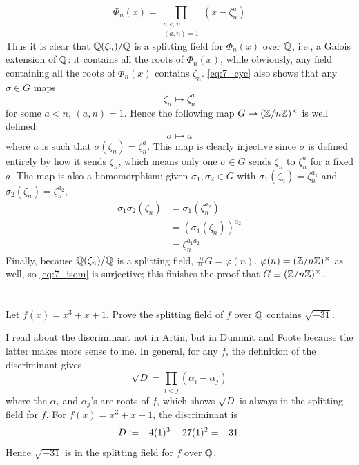 \documentclass[12pt]{article}
\begin{document}
\begin{equation} \label{eq:7_cyc} 
  \Phi_n(x) = \prod_{\substack{a < n \\ (a, n) = 1}} (x - \zeta_n^{a})
\end{equation}
Thus it is clear that $\mathbb{Q}(\zeta_n) / \mathbb{Q}$ is a splitting field for $\Phi_n(x)$ over $\mathbb{Q}$,
i.e., a Galois extension of $\mathbb{Q}$: 
it contains all the roots of $\Phi_n(x)$, while obviously, any field containing all the roots of $\Phi_n(x)$ contains $\zeta_n$. 
\eqref{eq:7_cyc} also shows that any $\sigma \in G$ maps 
$$\zeta_n \mapsto \zeta_n^{a}$$
for some $a < n$, $(a, n) = 1$. 
Hence the following map $G \rightarrow (\mathbb{Z} / n\mathbb{Z})^{\times}$ is well defined: 
\begin{equation} \label{eq:7_isom} 
  \sigma \mapsto a 
\end{equation}
where $a$ is such that $\sigma(\zeta_n) = \zeta_{n}^{a}$. 
This map is clearly injective since $\sigma$ is defined entirely by how it sends $\zeta_n$, which means only one $\sigma \in G$ sends $\zeta_n$ to $\zeta_n^{a}$ for a fixed $a$. 
The map is also a homomorphism: 
given $\sigma_1, \sigma_2 \in G$ with $\sigma_1(\zeta_n) = \zeta_n^{a_1}$ and $\sigma_2(\zeta_n) = \zeta_n^{a_2}$, 
\begin{align*}
  \sigma_1 \sigma_2 (\zeta_n) & = \sigma_1 (\zeta_n^{a_2}) \\ 
							  & = (\sigma_1(\zeta_n))^{a_2} \\ 
							  & = \zeta_n^{a_1 a_2} 
\end{align*}
Finally, because $\mathbb{Q}(\zeta_n) / \mathbb{Q}$ is a splitting field, $\#G = \varphi(n)$. 
$\varphi(n) = (\mathbb{Z} / n\mathbb{Z})^{\times}$ as well, so \eqref{eq:7_isom} is surjective; 
this finishes the proof that $G \equiv (\Z / n\Z)^{\times}$. 

\section{}
Let $f(x) = x^3 + x + 1$. 
Prove the splitting field of $f$ over $\mathbb{Q}$ contains $\sqrt{-31}$. 

\noindent\dotfill 

I read about the discriminant not in Artin, but in Dummit and Foote because the latter makes more sense to me. 
In general, for any $f$, the definition of the discriminant gives 
$$\sqrt{D} = \prod_{i < j}(\alpha_i - \alpha_j)$$
where the $\alpha_i$ and $\alpha_j$'s are roots of $f$, which shows $\sqrt{D}$ is always in the splitting field for $f$. 
For $f(x) = x^3 + x + 1$, the discriminant is 
$$D \vcentcolon= -4(1)^3 - 27(1)^2 = -31.$$
Hence $\sqrt{-31}$ is in the splitting field for $f$ over $\mathbb{Q}$. 
\end{document}
